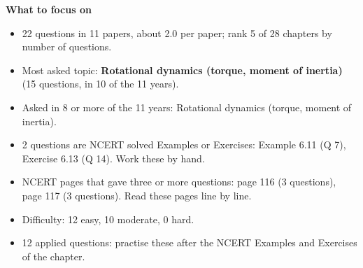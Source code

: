 \begin{minipage}[t]{0.63\linewidth}{\small\textbf{\color{crimson}What to focus on}\par\smallskip
\begin{itemize}[leftmargin=1.1em,itemsep=1pt,topsep=0pt]
\item 22 questions in 11 papers, about 2.0 per paper; rank 5 of 28 chapters by number of questions.
\item Most asked topic: \textbf{Rotational dynamics (torque, moment of inertia)} (15 questions, in 10 of the 11 years).
\item Asked in 8 or more of the 11 years: Rotational dynamics (torque, moment of inertia).
\item 2 questions are NCERT solved Examples or Exercises: Example 6.11 (Q 7), Exercise 6.13 (Q 14). Work these by hand.
\item NCERT pages that gave three or more questions: page 116 (3 questions), page 117 (3 questions). Read these pages line by line.
\item Difficulty: 12 easy, 10 moderate, 0 hard.
\item 12 applied questions: practise these after the NCERT Examples and Exercises of the chapter.
\end{itemize}}\end{minipage}\par
{}
